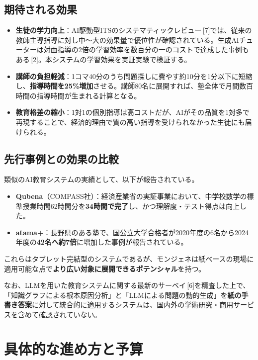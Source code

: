 \documentclass[paper=a4,fontsize=10.5bp,jafontsize=10.5bp,twocolumn]{jlreq}
\begin{document}
\subsection{期待される効果}

\begin{itemize}
  \item \textbf{生徒の学力向上}：AI駆動型ITSのシステマティックレビュー\,[7]では、従来の教師主導指導に対し中〜大の効果量で優位性が確認されている。生成AIチューターは対面指導の2倍の学習効率を数百分の一のコストで達成した事例もある\,[2]。本システムの学習効果を実証実験で検証する。
  \item \textbf{講師の負担軽減}：1コマ40分のうち問題探しに費やす約10分を1分以下に短縮し、\textbf{指導時間を25\%増加}させる。講師80名に展開すれば、塾全体で月間数百時間の指導時間が生まれる計算となる。
  \item \textbf{教育格差の縮小}：1対1の個別指導は高コストだが、AIがその品質を1対多で再現することで、経済的理由で質の高い指導を受けられなかった生徒にも届けられる。
\end{itemize}

\subsection{先行事例との効果の比較}

類似のAI教育システムの実績として、以下が報告されている。
\begin{itemize}
  \item \textbf{Qubena}（COMPASS社）：経済産業省の実証事業において、中学校数学の標準授業時間62時間分を\textbf{34時間で完了}し、かつ理解度・テスト得点は向上した。
  \item \textbf{atama+}：長野県のある塾で、国公立大学合格者が2020年度の6名から2024年度の\textbf{42名へ約7倍}に増加した事例が報告されている。
\end{itemize}

これらはタブレット完結型のシステムであるが、モンジェネは紙ベースの現場に適用可能な点で\textbf{より広い対象に展開できるポテンシャル}を持つ。

なお、LLMを用いた教育システムに関する最新のサーベイ\,[6]を精査した上で、「知識グラフによる根本原因分析」と「LLMによる問題の動的生成」を\textbf{紙の手書き答案}に対して統合的に適用するシステムは、国内外の学術研究・商用サービスを含めて確認されていない。

\section{具体的な進め方と予算}
\end{document}
